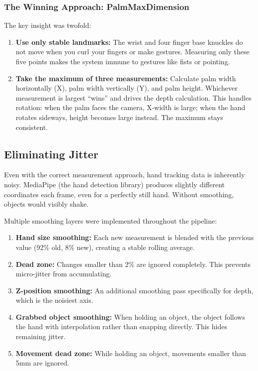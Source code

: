 \documentclass[11pt]{article}
\begin{document}
\subsubsection{The Winning Approach: PalmMaxDimension}

The key insight was twofold:

\begin{enumerate}
    \item \textbf{Use only stable landmarks:} The wrist and four finger base knuckles do not move when you curl your fingers or make gestures. Measuring only these five points makes the system immune to gestures like fists or pointing.

    \item \textbf{Take the maximum of three measurements:} Calculate palm width horizontally (X), palm width vertically (Y), and palm height. Whichever measurement is largest ``wins'' and drives the depth calculation. This handles rotation: when the palm faces the camera, X-width is large; when the hand rotates sideways, height becomes large instead. The maximum stays consistent.
\end{enumerate}


\subsection{Eliminating Jitter}

Even with the correct measurement approach, hand tracking data is inherently noisy. MediaPipe (the hand detection library) produces slightly different coordinates each frame, even for a perfectly still hand. Without smoothing, objects would visibly shake.

Multiple smoothing layers were implemented throughout the pipeline:

\begin{enumerate}
    \item \textbf{Hand size smoothing:} Each new measurement is blended with the previous value (92\% old, 8\% new), creating a stable rolling average.

    \item \textbf{Dead zone:} Changes smaller than 2\% are ignored completely. This prevents micro-jitter from accumulating.

    \item \textbf{Z-position smoothing:} An additional smoothing pass specifically for depth, which is the noisiest axis.

    \item \textbf{Grabbed object smoothing:} When holding an object, the object follows the hand with interpolation rather than snapping directly. This hides remaining jitter.

    \item \textbf{Movement dead zone:} While holding an object, movements smaller than 5mm are ignored.
\end{enumerate}
\end{document}
